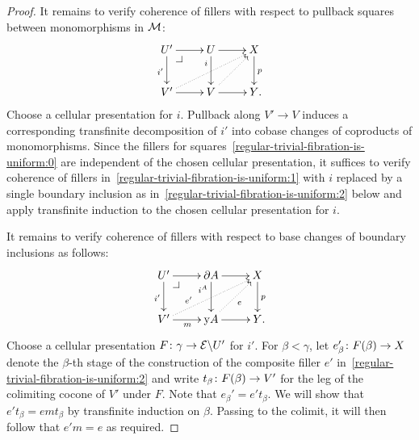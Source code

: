 \documentclass[reqno,10pt,a4paper,oneside,draft]{amsart}
\begin{document}
{{\begin{proof}
It remains to verify coherence of fillers with respect to pullback squares between monomorphisms in $\cal{M}$:
\begin{equation} \label{regular-trivial-fibration-is-uniform:1}
\begin{gathered}
\xymatrix{
  U'
  \ar[d]_{i'}
  \ar[r]
  \pullback{dr}
&
  U
  \ar[d]_(0.3){i}
  \ar[r]
&
  X
  \ar[d]^{p}
\\
  V'
  \ar[r]
  \ar@{.>}[urr]
&
  V
  \ar[r]
  \ar@{.>}[ur]
&
  Y
\rlap{.}}
\end{gathered}
\end{equation}
Choose a cellular presentation for $i$.
Pullback along $V' \to V$ induces a corresponding transfinite decomposition of $i'$ into cobase changes of coproducts of monomorphisms.
Since the fillers for squares~\eqref{regular-trivial-fibration-is-uniform:0} are independent of the chosen cellular presentation, it suffices to verify coherence of fillers in~\eqref{regular-trivial-fibration-is-uniform:1} with $i$ replaced by a single boundary inclusion as in~\eqref{regular-trivial-fibration-is-uniform:2} below and apply transfinite induction to the chosen cellular presentation for $i$.

It remains to verify coherence of fillers with respect to base changes of boundary inclusions as follows:
\begin{equation} \label{regular-trivial-fibration-is-uniform:2}
\begin{gathered}
\xymatrix{
  U'
  \ar[d]_{i'}
  \ar[r]
  \pullback{dr}
&
  \partial A
  \ar[d]_(0.3){i^A}
  \ar[r]
&
  X
  \ar[d]^{p}
\\
  V'
  \ar[r]_{m}
  \ar@{.>}[urr]^(0.3){e'}
&
  \yon A
  \ar[r]
  \ar@{.>}[ur]_{e}
&
  Y
\rlap{.}}
\end{gathered}
\end{equation}
Choose a cellular presentation $F \co \gamma \to \catE \backslash U'$ for $i'$.
For $\beta < \gamma$, let $e_{\beta}' \co F(\beta) \to X$ denote the $\beta$-th stage of the construction of the composite filler $e'$ in~\eqref{regular-trivial-fibration-is-uniform:2} and write $t_{\beta} \co F(\beta) \to V'$ for the leg of the colimiting cocone of $V'$ under $F$.
Note that $e_{\beta}' = e' t_{\beta}$.
We will show that $e' t_{\beta} = e m t_{\beta}$ by transfinite induction on $\beta$.
Passing to the colimit, it will then follow that $e' m = e$ as required.


\end{proof}}}
\end{document}
